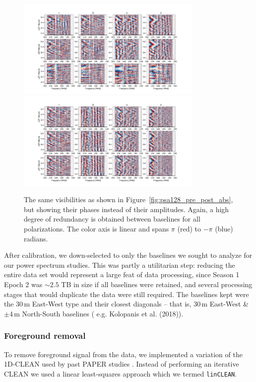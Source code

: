 \begin{figure}
\centering
\includegraphics[width=0.8\textwidth]{chapters/psa128_pol/figures/nocal_IQUV_6680_phase.pdf}
\includegraphics[width=0.8\textwidth]{chapters/psa128_pol/figures/omnical_IQUV_6680_phase.pdf}
\caption[The same visibilities as shown in Figure~\ref{fig:psa128_pre_post_abs}, but showing their phases instead of their amplitudes.]{The same visibilities as shown in Figure~\ref{fig:psa128_pre_post_abs}, but showing their phases instead of their amplitudes. Again, a high degree of redundancy is obtained between baselines for all polarizations. The color axis is linear and spans $\pi$ (red) to $-\pi$ (blue) radians.}
\label{fig:psa128_pre_post_phs}
\end{figure}

After calibration, we down-selected to only the baselines we sought to analyze for our power spectrum studies. This was partly a utilitarian step: reducing the entire data set would represent a large feat of data processing, since Season 1 Epoch 2 was $\sim2.5$ TB in size if all baselines were retained, and several processing stages that would duplicate the data were still required. The baselines kept were the 30\,m East-West type and their closest diagonals -- that is, 30\,m East-West \& $\pm$4\,m North-South baselines ({\color{red} e.g. Kolopanis et al. (2018)}).

\subsubsection{Foreground removal}
To remove foreground signal from the data, we implemented a variation of the 1D-CLEAN \citep{ParsonsBacker.09} used by past PAPER studies \citep[][{\color{red}; Kolopanis et al. 2018}]{Parsons.14, Ali.15, Jacobs.15, Moore.17, Kerrigan.18}. Instead of performing an iterative CLEAN we used a linear least-squares approach which we termed {\tt linCLEAN}.

